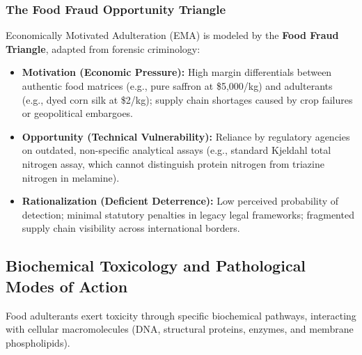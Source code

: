 \documentclass[11pt,a4paper,oneside]{article}
\begin{document}
\subsubsection{The Food Fraud Opportunity Triangle}
Economically Motivated Adulteration (EMA) is modeled by the \textbf{Food Fraud Triangle}, adapted from forensic criminology:
\begin{itemize}[leftmargin=*]
    \item \textbf{Motivation (Economic Pressure):} High margin differentials between authentic food matrices (e.g., pure saffron at \$5,000/kg) and adulterants (e.g., dyed corn silk at \$2/kg); supply chain shortages caused by crop failures or geopolitical embargoes.
    \item \textbf{Opportunity (Technical Vulnerability):} Reliance by regulatory agencies on outdated, non-specific analytical assays (e.g., standard Kjeldahl total nitrogen assay, which cannot distinguish protein nitrogen from triazine nitrogen in melamine).
    \item \textbf{Rationalization (Deficient Deterrence):} Low perceived probability of detection; minimal statutory penalties in legacy legal frameworks; fragmented supply chain visibility across international borders.
\end{itemize}

\subsection{Biochemical Toxicology and Pathological Modes of Action}

Food adulterants exert toxicity through specific biochemical pathways, interacting with cellular macromolecules (DNA, structural proteins, enzymes, and membrane phospholipids).
\end{document}
